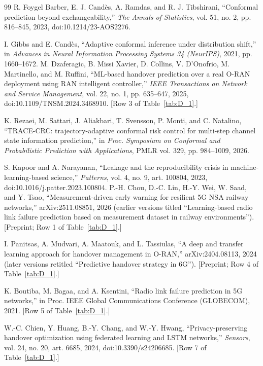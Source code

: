 \begin{thebibliography}{99}
 R. Foygel Barber, E. J. Cand\`es, A. Ramdas, and R. J. Tibshirani, ``Conformal prediction beyond exchangeability,'' \textit{The Annals of Statistics}, vol. 51, no. 2, pp. 816--845, 2023, doi:10.1214/23-AOS2276.

 I. Gibbs and E. Cand\`es, ``Adaptive conformal inference under distribution shift,'' in \textit{Advances in Neural Information Processing Systems 34 (NeurIPS)}, 2021, pp. 1660--1672.
 M. Dzaferagic, B. Missi Xavier, D. Collins, V. D'Onofrio, M. Martinello, and M. Ruffini, ``ML-based handover prediction over a real O-RAN deployment using RAN intelligent controller,'' \textit{IEEE Transactions on Network and Service Management}, vol. 22, no. 1, pp. 635--647, 2025, doi:10.1109/TNSM.2024.3468910. [Row 3 of Table~\ref{tab:D_1}.]

 K. Rezaei, M. Sattari, J. Aliakbari, T. Svensson, P. Monti, and C. Natalino, ``TRACE-CRC: trajectory-adaptive conformal risk control for multi-step channel state information prediction,'' in \textit{Proc. Symposium on Conformal and Probabilistic Prediction with Applications}, PMLR vol. 329, pp. 984--1009, 2026.

 S. Kapoor and A. Narayanan, ``Leakage and the reproducibility crisis in machine-learning-based science,'' \textit{Patterns}, vol. 4, no. 9, art. 100804, 2023, doi:10.1016/j.patter.2023.100804.
 P.-H. Chou, D.-C. Lin, H.-Y. Wei, W. Saad, and Y. Tsao, ``Measurement-driven early warning for resilient 5G NSA railway networks,'' arXiv:2511.08851, 2026 (earlier versions titled ``Learning-based radio link failure prediction based on measurement dataset in railway environments''). [Preprint; Row 1 of Table~\ref{tab:D_1}.]

 I. Panitsas, A. Mudvari, A. Maatouk, and L. Tassiulas, ``A deep and transfer learning approach for handover management in O-RAN,'' arXiv:2404.08113, 2024 (later versions retitled ``Predictive handover strategy in 6G''). [Preprint; Row 4 of Table~\ref{tab:D_1}.]

 K. Boutiba, M. Bagaa, and A. Ksentini, ``Radio link failure prediction in 5G networks,'' in Proc. IEEE Global Communications Conference (GLOBECOM), 2021. [Row 5 of Table~\ref{tab:D_1}.]

 W.-C. Chien, Y. Huang, B.-Y. Chang, and W.-Y. Hwang, ``Privacy-preserving handover optimization using federated learning and LSTM networks,'' \textit{Sensors}, vol. 24, no. 20, art. 6685, 2024, doi:10.3390/s24206685. [Row 7 of Table~\ref{tab:D_1}.]


\end{thebibliography}
